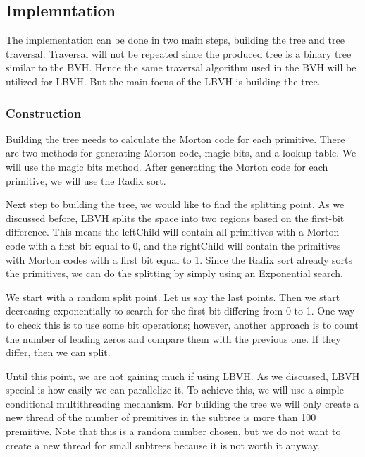 \documentclass[11pt,a4paper]{article}
\begin{document}
\subsection{Implemntation}
The implementation can be done in two main steps, building the tree and tree traversal. Traversal will not be repeated since the produced tree is a binary tree similar to the BVH. Hence the same traversal algorithm used in the BVH will be utilized for LBVH. But the main focus of the LBVH is building the tree.


\subsubsection{Construction}
 Building the tree needs to calculate the Morton code for each primitive. There are two methods for generating Morton code, magic bits, and a lookup table. We will use the magic bits method. After generating the Morton code for each primitive, we will use the Radix sort.

Next step to building the tree, we would like to find the splitting point. As we discussed before, LBVH splits the space into two regions based on the first-bit difference. This means the leftChild will contain all primitives with a Morton code with a first bit equal to 0, and the rightChild will contain the primitives with Morton codes with a first bit equal to 1. Since the Radix sort already sorts the primitives, we can do the splitting by simply using an Exponential search. 

We start with a random split point. Let us say the last points. Then we start decreasing exponentially to search for the first bit differing from 0 to 1. One way to check this is to use some bit operations; however, another approach is to count the number of leading zeros and compare them with the previous one. If they differ, then we can split. 

Until this point, we are not gaining much if using LBVH. As we discussed, LBVH special is how easily we can parallelize it. To achieve this, we will use a simple conditional multithreading mechanism. For building the tree we will only create a new thread of the number of premitives in the subtree is more than 100 premiitive. Note that this is a random number chosen, but we do not want to create a new thread for small subtrees because it is not worth it anyway.
\end{document}
